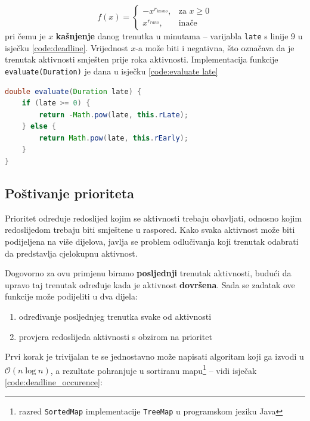 \documentclass[times, utf8, zavrsni]{fer}
\begin{document}
\begin{equation}\label{fja:expdeadline}
f(x)= 
\begin{cases}
    -x^{r_{kasno}}, & \text{za } x\geq 0\\
    x^{r_{rano}},  & \text{inače}
\end{cases}
\end{equation}
pri čemu je $x$ \textbf{kašnjenje} danog trenutka u minutama -- varijabla \texttt{late} s linije 9 u isječku \ref{code:deadline}. Vrijednost $x$-a može biti i negativna, što označava da je trenutak aktivnosti smješten prije roka aktivnosti. Implementacija funkcije \texttt{evaluate(Duration)} je dana u isječku \ref{code:evaluate late}

\begin{lstlisting}[language=java, caption=Ocjena kašnjenja trenutka, label={code:evaluate late}, mathescape]
double evaluate(Duration late) {
	if (late >= 0) {
		return -Math.pow(late, this.rLate);
	} else {
		return Math.pow(late, this.rEarly);
	}
}
\end{lstlisting}

\subsection{Poštivanje prioriteta}\label{fja:postivanje prioriteta}
Prioritet određuje redoslijed kojim se aktivnosti trebaju obavljati, odnosno kojim redoslijedom trebaju biti smještene u raspored. Kako svaka aktivnost može biti podijeljena na više dijelova, javlja se problem odlučivanja koji trenutak odabrati da predstavlja cjelokupnu aktivnost. 

Dogovorno za ovu primjenu biramo \textbf{posljednji} trenutak aktivnosti, budući da upravo taj trenutak određuje kada je aktivnost \textbf{dovršena}. Sada se zadatak ove funkcije može podijeliti u dva dijela:
\begin{enumerate}
  \item određivanje posljednjeg trenutka svake od aktivnosti
  \item provjera redoslijeda aktivnosti s obzirom na prioritet
\end{enumerate}

Prvi korak je trivijalan te se jednostavno može napisati algoritam koji ga izvodi u $\mathcal{O}(n\log{}n)$, a rezultate pohranjuje u sortiranu mapu\footnote{razred \texttt{SortedMap} implementacije \texttt{TreeMap} u programskom jeziku Java} -- vidi isječak \ref{code:deadline_occurence}:
\end{document}
